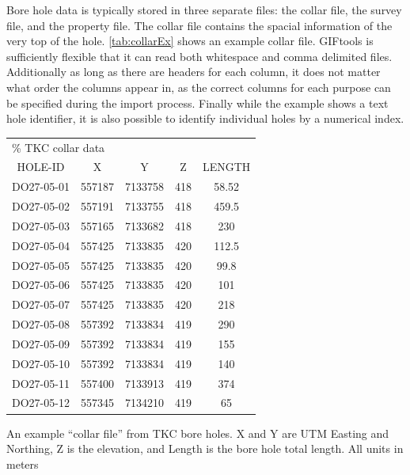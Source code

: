 Bore hole data is typically stored in three separate files: the collar file, the survey file, and the property file. The collar file contains the spacial information of the very top of the hole.  \autoref{tab:collarEx} shows an example collar file. GIFtools is sufficiently flexible that it can read both whitespace and comma delimited files. Additionally as long as there are headers for each column, it does not matter what order the columns appear in, as the correct columns for each purpose can be specified during the import process. Finally while the example shows a text hole identifier, it is also possible to identify individual holes by a numerical index.
\begin{fileExample}
\begin{tabular}{|ccccc|}   
\hline
\multicolumn{5}{|l|}{\% TKC collar data} \\
HOLE-ID & X & Y & Z & LENGTH \\
DO27-05-01 & 557187 & 7133758 & 418 & 58.52 \\
DO27-05-02 & 557191 & 7133755 & 418 & 459.5 \\
DO27-05-03 & 557165 & 7133682 & 418 & 230 \\
DO27-05-04 & 557425 & 7133835 & 420 & 112.5 \\
DO27-05-05 & 557425 & 7133835 & 420 & 99.8 \\
DO27-05-06 & 557425 & 7133835 & 420 & 101 \\
DO27-05-07 & 557425 & 7133835 & 420 & 218 \\
DO27-05-08 & 557392 & 7133834 & 419 & 290 \\
DO27-05-09 & 557392 & 7133834 & 419 & 155 \\
DO27-05-10 & 557392 & 7133834 & 419 & 140 \\
DO27-05-11 & 557400 & 7133913 & 419 & 374 \\
DO27-05-12 & 557345 & 7134210 & 419 & 65 \\
\hline
\end{tabular}
\caption{An example ``collar file'' from TKC bore holes. X and Y are UTM Easting and Northing, Z is the elevation, and Length is the bore hole total length.  All units in meters}
\label{tab:collarEx}
\end{fileExample}

